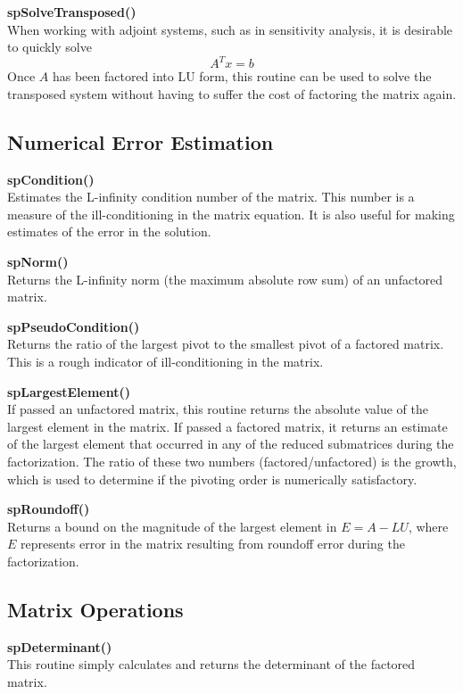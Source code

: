 \documentclass[11pt]{article}
\begin{document}
{\bf spSolveTransposed()}\\
When working with adjoint systems, such as in sensitivity analysis, it
is desirable to quickly solve
\begin{equation}
A^T x = b
\end{equation}
Once $A$ has been factored into LU form, this
routine can be used to solve the transposed system without having to
suffer the cost of factoring the matrix again.

\subsection{Numerical Error Estimation}

{\bf spCondition()}\\
Estimates the L-infinity condition number of the matrix.  This number is
a measure of the ill-conditioning in the matrix equation.  It is also useful
for making estimates of the error in the solution.

{\bf spNorm()}\\
Returns the L-infinity norm (the maximum absolute row sum) of an unfactored
matrix.

{\bf spPseudoCondition()}\\
Returns the ratio of the largest pivot to the smallest pivot of a factored
matrix.  This is a rough indicator of ill-conditioning in the matrix.

{\bf spLargestElement()}\\
If passed an unfactored matrix, this routine returns the absolute value of
the largest element in the matrix.  If passed a factored matrix, it returns
an estimate of the largest element that occurred in any of the reduced
submatrices during the factorization.  The ratio of these two numbers
(factored/unfactored) is the growth, which is used to determine if the
pivoting order is numerically satisfactory.

{\bf spRoundoff()}\\
Returns a bound on the magnitude of the largest element in
$E = A - LU$, where $E$ represents error in
the matrix resulting from roundoff error during the factorization.

\subsection{Matrix Operations}

{\bf spDeterminant()}\\
This routine simply calculates and returns the determinant of the
factored matrix.
\end{document}
